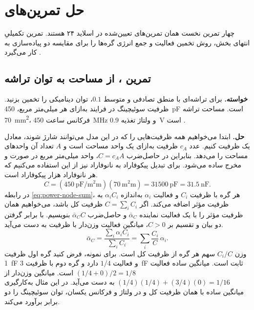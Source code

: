 \section{حل تمرین‌های }
\label{sec:power-exercises}

چهار تمرین نخست همان تمرین‌های تعیین‌شده در اسلاید ۲۴ هستند.
تمرین تکمیلیِ انتهای بخش، روش تخمین فعالیت و جمع انرژی گره‌ها را
برای مقایسه دو پیاده‌سازی به کار می‌گیرد
\cite[اسلاید ۲۴]{powerslides}\cite[صفحات ۲۰۹ و ۲۱۰]{weste}.

\subsection{تمرین ، از مساحت به توان تراشه}
\label{sec:power-exercise-chip}

\textbf{خواسته.}
برای تراشه‌ای با منطق تصادفی و  متوسط \(0.1\)،
توان دینامیکی را تخمین بزنید. ظرفیت سوئیچینگ در فرایند 
به‌ازای هر میلی‌متر مربع، \qty{450}{\pico\farad} است. مساحت تراشه
\qty{70}{\square\milli\metre}، فرکانس ساعت \qty{450}{\mega\hertz}
و ولتاژ تغذیه \qty{0.9}{\volt} است
\cite[تمرین ، صفحه ۲۰۹]{weste}.

\textbf{حل.}
ابتدا می‌خواهیم همه ظرفیت‌هایی را که در این مدل می‌توانند شارژ
شوند، معادل یک ظرفیت کنیم. عدد \(c_A\) ظرفیت به‌ازای یک واحد
مساحت است و \(A\) تعداد آن واحدهای مساحت را می‌دهد. بنابراین
در حاصل‌ضرب \(C=c_AA\)، واحد میلی‌متر مربع در صورت و مخرج ساده
می‌شود. برای تبدیل پیکوفاراد به نانوفاراد نیز از این استفاده
می‌کنیم که هر نانوفاراد هزار پیکوفاراد است.
\[
  C=(\qty[per-mode=symbol]{450}{\pico\farad\per\square\milli\metre})
       (\qty{70}{\square\milli\metre})
     =\qty{31500}{\pico\farad}=\qty{31.5}{\nano\farad}.
\]
در رابطه \eqref{eq:power-node-sum}، هر گره با ظرفیت \(C_i\)
و فعالیت \(\alpha_i\) به‌اندازه \(\alpha_i C_i\) به ظرفیت مؤثر
اضافه می‌کند. اگر \(C=\sum_i C_i\) ظرفیت کل باشد، می‌خواهیم
همان ظرفیت مؤثر را با یک فعالیت نماینده \(\bar\alpha_C\) و
حاصل‌ضرب \(\bar\alpha_C C\) بنویسیم. با برابر گرفتن دو بیان
و تقسیم بر \(C>0\)، میانگین فعالیت وزن‌دار با ظرفیت به دست می‌آید.
\begin{equation}
  \bar\alpha_C
   =\frac{\sum_i\alpha_i C_i}{\sum_i C_i}
   =\sum_i\frac{C_i}{C}\,\alpha_i.
  \label{eq:power-capacitance-weighted-activity}
\end{equation}
وزن \(C_i/C\) سهم هر گره از ظرفیت کل است. برای نمونه، فرض کنید
گره اول ظرفیت \qty{1}{\femto\farad} و فعالیت \(1/4\) دارد
و گره دوم با ظرفیت \qty{3}{\femto\farad} ثابت است. میانگین
ساده فعالیت \((1/4+0)/2=1/8\) است. میانگین وزن‌دار از
\((1/4)(1/4)+(3/4)(0)=1/16\) به دست می‌آید. در این مثال
به‌کارگیری میانگین ساده با همان ظرفیت کل و در ولتاژ و فرکانس
یکسان، توان سوئیچینگ را دو برابر برآورد می‌کند.

